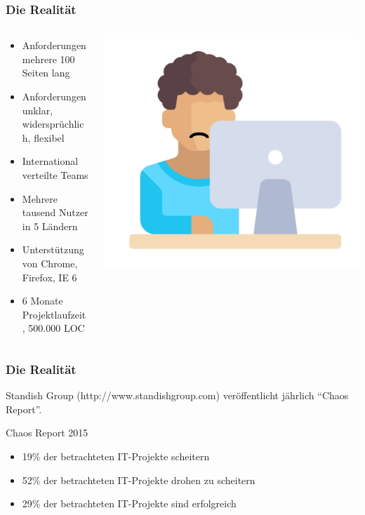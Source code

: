 \begin{frame}
\frametitle{Die Realität}
	\begin{columns}
		\begin{column}{0.5\textwidth}
			\small
			\begin{itemize}
				\item Anforderungen mehrere 100 Seiten lang
				\item Anforderungen unklar, widersprüchlich, flexibel
				\item International verteilte Teams
				\item Mehrere tausend Nutzer in 5 Ländern
				\item Unterstützung von Chrome, Firefox, IE 6
				\item 6 Monate Projektlaufzeit, 500.000 LOC
			\end{itemize}
			\normalsize
		\end{column}
		\begin{column}{.5\textwidth}
			\center\includegraphics[width=1\textwidth,
			keepaspectratio=true]{bilder/student_traurig.png}
		\end{column}
	\end{columns}
\end{frame}

\begin{frame}
\frametitle{Die Realität}
	Standish Group (http://www.standishgroup.com) veröffentlicht
	jährlich ``Chaos Report''.
	\newline\newline
	\begin{block}{Chaos Report 2015}
		\begin{itemize}
			\item 19\% der betrachteten IT-Projekte scheitern
			\item 52\% der betrachteten IT-Projekte drohen zu scheitern
			\item 29\% der betrachteten IT-Projekte sind erfolgreich
		\end{itemize}
	\end{block}
\end{frame}

